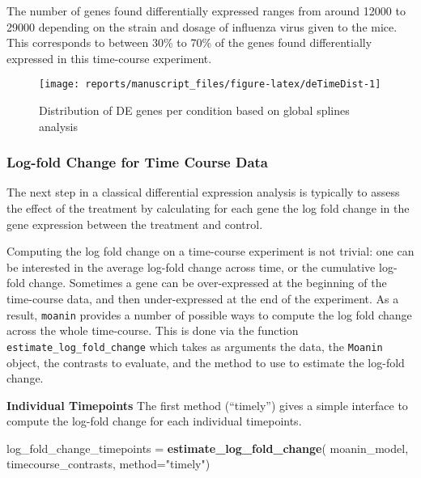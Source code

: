 \documentclass[9pt,a4paper,]{extarticle}
\newenvironment{Shaded}{\begin{snugshade}}{\end{snugshade}}
\newcommand{\DataTypeTok}[1]{\textcolor[rgb]{0.13,0.29,0.53}{#1}}
\newcommand{\KeywordTok}[1]{\textcolor[rgb]{0.13,0.29,0.53}{\textbf{#1}}}
\newcommand{\NormalTok}[1]{#1}
\newcommand{\StringTok}[1]{\textcolor[rgb]{0.31,0.60,0.02}{#1}}
\begin{document}
The number of genes found differentially expressed ranges from around 12000 to
29000 depending on the strain and dosage of influenza virus given to the mice.
This corresponds to between 30\% to 70\% of the genes found differentially
expressed in this time-course experiment.

\begin{figure}[H]

{\centering \texttt{[image: reports/manuscript\_files/figure-latex/deTimeDist-1]} 

}

\caption{Distribution of DE genes per condition based on global splines analysis}\label{fig:deTimeDist}
\end{figure}

\hypertarget{log-fold-change-for-time-course-data}{%
\subsubsection{Log-fold Change for Time Course Data}\label{log-fold-change-for-time-course-data}}

The next step in a classical differential expression analysis is typically to
assess the effect of the treatment by calculating for each gene the log fold change in the gene expression between the treatment and control.

Computing the log fold change on a time-course experiment is not trivial: one
can be interested in the average log-fold change across time, or the
cumulative log-fold change. Sometimes a gene can be over-expressed at the
beginning of the time-course data, and then under-expressed at the end of the
experiment. As a result, \texttt{moanin} provides a number of possible ways to
compute the log fold change across the whole time-course. This is done via the function \texttt{estimate\_log\_fold\_change} which takes as
arguments the data, the \texttt{Moanin} object, the contrasts to evaluate, and the method to use to estimate the log-fold change.

\textbf{Individual Timepoints} The first method (``timely'') gives a simple interface to compute the log-fold change
for each individual timepoints.

\begin{Shaded}
\begin{Highlighting}[]
\NormalTok{log_fold_change_timepoints =}\StringTok{ }\KeywordTok{estimate_log_fold_change}\NormalTok{(}
\NormalTok{    moanin_model, timecourse_contrasts,  }\DataTypeTok{method=}\StringTok{"timely"}\NormalTok{)}
\end{Highlighting}
\end{Shaded}
\end{document}
